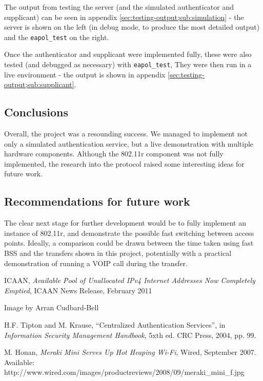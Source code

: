 \documentclass[12pt,a4paper,titlepage]{article}
\begin{document}
The output from testing the server (and the simulated authenticator and supplicant) can be seen in appendix \ref{sec:testing-output;sub:simulation} - the server is shown on the left (in debug mode, to produce the most detailed output) and the \texttt{eapol\_test} on the right. 

Once the authenticator and supplicant were implemented fully, these were also tested (and debugged as necessary) with \texttt{eapol\_test}, They were then run in a live environment - the output is shown in appendix \ref{sec:testing-output;sub:supplicant}.

\subsection{Conclusions}
Overall, the project was a resounding success. We managed to implement not only a simulated authentication service, but a live demonstration with multiple hardware components. Although the 802.11r component was not fully implemented, the research into the protocol raised some interesting ideas for future work.

\subsection{Recommendations for future work}
The clear next stage for further development would be to fully implement an instance of 802.11r, and demonstrate the possible fast switching between access points. Ideally, a comparison could be drawn between the time taken using fast BSS and the transfers shown in this project, potentially with a practical demonstration of running a VOIP call during the transfer.

\newpage
\begin{thebibliography}{99}

 ICAAN, \textit{Available Pool of Unallocated IPv4 Internet Addresses Now Completely Emptied}, ICAAN News Release, February 2011

 Image by Arran Cudbard-Bell

H.F. Tipton and M. Krause, ``Centralized Authentication Services'', in \textit{Information Security Management Handbook}, 5xth ed. CRC Press, 2004, pp. 99.

M. Honan, \textit{Meraki Mini Serves Up Hot Heaping Wi-Fi}, Wired, September 2007. Available: http://www.wired.com/images/productreviews/2008/09/meraki\_mini\_f.jpg

\end{thebibliography}
\end{document}

